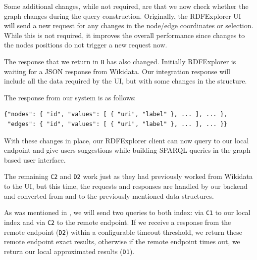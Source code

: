 Some additional changes, while not required, are that we now check whether the graph  changes during the query construction. Originally, the RDFExplorer UI will send a new request for any changes in the node/edge coordinates or selection. While this is not required, it improves the overall performance since changes to the nodes positions do not trigger a new request now. 

The response that we return in \texttt{B} has also changed. Initially RDFExplorer is waiting for a JSON response from Wikidata. Our integration response will include all the data required by the UI, but with some changes in the structure. 

The response from our system is as follows:
\begin{verbatim}
{"nodes": { "id", "values": [ { "uri", "label" }, ... ], ... },
 "edges": { "id", "values": [ { "uri", "label" }, ... ], ... }}
\end{verbatim}

With these changes in place, our RDFExplorer client can now query to our local endpoint and give users suggestions while building SPARQL queries in the graph-based user interface.

The remaining \texttt{C2} and \texttt{D2} work just as they had previously worked from Wikidata to the UI, but this time, the requests and responses are handled by our backend and converted from and to the previously mentioned data structures.

As was mentioned in , we will send two queries to both index: via \texttt{C1} to our local index and via \texttt{C2} to the remote endpoint. If we receive a response from the remote endpoint (\texttt{D2}) within a configurable timeout threshold, we return these remote endpoint exact results, otherwise if the remote endpoint times out, we return our local approximated results (\texttt{D1}).
